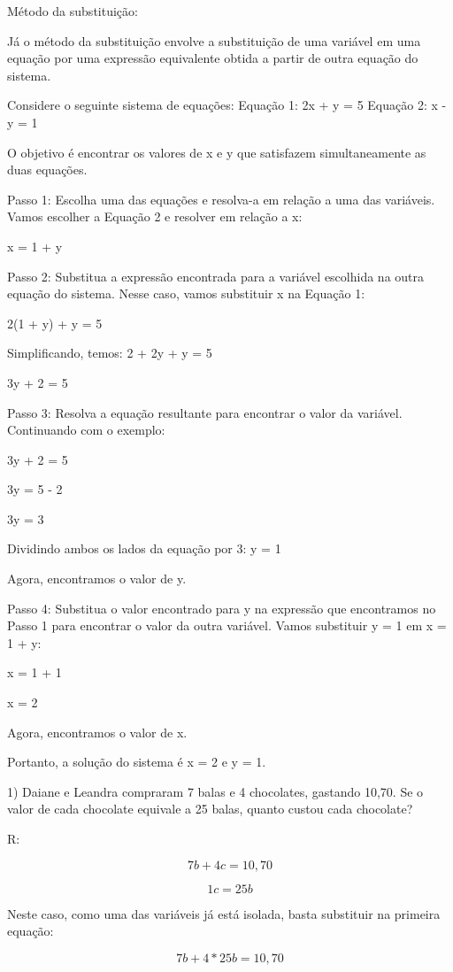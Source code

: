 Método da substituição:

Já o método da substituição envolve a substituição de uma variável em
uma equação por uma expressão equivalente obtida a partir de outra
equação do sistema.

Considere o seguinte sistema de equações: Equação 1: 2x + y = 5 Equação
2: x - y = 1

O objetivo é encontrar os valores de x e y que satisfazem
simultaneamente as duas equações.

Passo 1: Escolha uma das equações e resolva-a em relação a uma das
variáveis. Vamos escolher a Equação 2 e resolver em relação a x:

x = 1 + y

Passo 2: Substitua a expressão encontrada para a variável escolhida na
outra equação do sistema. Nesse caso, vamos substituir x na Equação 1:

2(1 + y) + y = 5

Simplificando, temos: 2 + 2y + y = 5

3y + 2 = 5

Passo 3: Resolva a equação resultante para encontrar o valor da
variável. Continuando com o exemplo:

3y + 2 = 5

3y = 5 - 2

3y = 3

Dividindo ambos os lados da equação por 3: y = 1

Agora, encontramos o valor de y.

Passo 4: Substitua o valor encontrado para y na expressão que
encontramos no Passo 1 para encontrar o valor da outra variável. Vamos
substituir y = 1 em x = 1 + y:

x = 1 + 1

x = 2

Agora, encontramos o valor de x.

Portanto, a solução do sistema é x = 2 e y = 1.


1) Daiane e Leandra compraram 7 balas e 4 chocolates, gastando 10,70. Se
o valor de cada chocolate equivale a 25 balas, quanto custou cada
chocolate?

R:

\[7b + 4c = 10,70\]

\[1c = 25b\]

Neste caso, como uma das variáveis já está isolada, basta substituir na
primeira equação:

\[7b + 4*25b = 10,70\]

